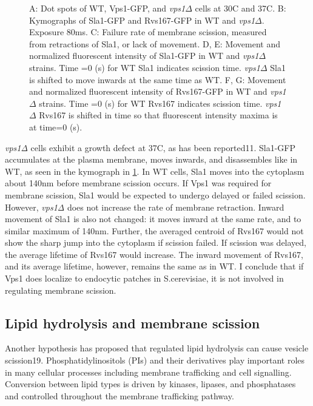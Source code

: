 \begin{figure}
	{A: Dot spots of WT, Vps1-GFP, and \textit{vps1$\Delta$} cells at 30C and 37C. 
		B: Kymographs of Sla1-GFP and Rvs167-GFP in WT and \textit{vps1$\Delta$}. Exposure 80ms.  
		C: Failure rate of membrane scission, measured from retractions of Sla1, or lack of movement. 
		D, E: Movement and normalized fluorescent intensity of Sla1-GFP in WT and \textit{vps1$\Delta$} strains. Time =0 (s) for WT Sla1 indicates scission time. \textit{vps1$\Delta$} Sla1  is shifted to move inwards at the same time as WT. 
		F, G: Movement and normalized fluorescent intensity of Rvs167-GFP in WT and \textit{vps1$\Delta$} strains. Time =0 (s) for WT Rvs167 indicates scission time. \textit{vps1$\Delta$} Rvs167 is shifted in time so that fluorescent intensity maxima is at time=0 (s).
		\label{fig4_vpsdel}}
	\end{figure}

	
	\vspace{5mm}
	\textit{vps1Δ }cells exhibit a growth defect at 37C, as has been reported11. Sla1-GFP accumulates at the plasma membrane, moves inwards, and disassembles like in WT, as seen in the kymograph in \ref{fig4_vpsdel}. In WT cells, Sla1 moves into the cytoplasm about 140nm before membrane scission occurs. If Vps1 was required for membrane scission, Sla1 would be expected to undergo delayed or failed scission. However, \textit{vps1Δ} does not increase the rate of membrane retraction. Inward movement of Sla1 is also not changed: it moves inward at the same rate, and to similar maximum of 140nm. Further, the averaged centroid of Rvs167 would not show the sharp jump into the cytoplasm if scission failed. If scission was delayed, the average lifetime of Rvs167 would increase. The inward movement of Rvs167, and its average lifetime, however, remains the same as in WT. I conclude that if Vps1 does localize to endocytic patches in S.cerevisiae, it is not involved in regulating membrane scission.  


	\subsection{Lipid hydrolysis and membrane scission}
	
	Another hypothesis has proposed that regulated lipid hydrolysis can cause vesicle scission19. Phosphatidylinositols (PIs) and their derivatives play important roles in many cellular processes including membrane trafficking and cell signalling. Conversion between lipid types is driven by kinases, lipases, and phosphatases and controlled throughout the membrane trafficking pathway. 
	
